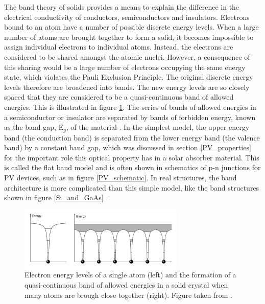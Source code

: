 The band theory of solids provides a means to explain the difference in the electrical conductivity of conductors, semiconductors and insulators. Electrons bound to an atom have a number of possible discrete energy levels. When a large number of atoms are brought together to form a solid, it becomes impossible to assign individual electrons to individual atoms. Instead, the electrons are considered to be shared amongst the atomic nuclei. However, a consequence of this sharing would be a large number of electrons occupying the same energy state, which violates the Pauli Exclusion Principle. The original discrete energy levels therefore are broadened into bands. The new energy levels are so closely spaced that they are considered to be a quasi-continuous band of allowed energies. This is illustrated in figure \ref{band_Elevels}. The series of bands of allowed energies in a semiconductor or insulator are separated by bands of forbidden energy, known as the band gap, E$_g$, of the material \cite{dielectric1}. In the simplest model, the upper energy band (the conduction band) is separated from the lower energy band (the valence band) by a constant band gap, which was discussed in section \ref{PV_properties} for the important role this optical property has in a solar absorber material. This is called the flat band model and is often shown in schematics of p-n junctions for PV devices, such as in figure \ref{PV_schematic}. In real structures, the band architecture is more complicated than this simple model, like the band structures shown in figure \ref{Si_and_GaAs} \cite{Tilley}.\\

\begin{figure}[h!]
  \centering
    \includegraphics[width=0.7\textwidth]{figures/band_Elevels.png}
    \caption{Electron energy levels of a single atom (left) and the formation of a quasi-continuous band of allowed energies in a solid crystal when many atoms are brough close together (right). Figure taken from .}
  \label{band_Elevels}
\end{figure}

